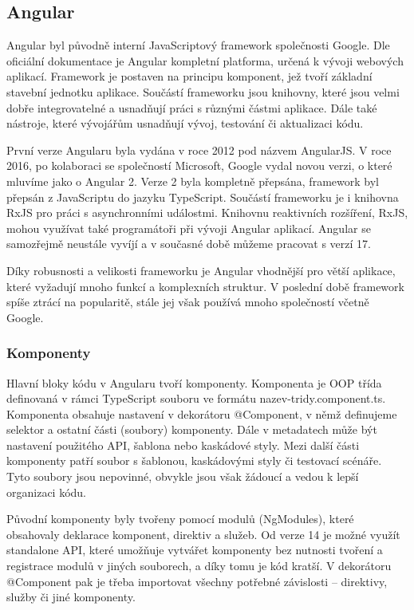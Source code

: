 \subsection{Angular}

Angular byl původně interní JavaScriptový framework společnosti Google. 
Dle oficiální dokumentace \cite{angulario} je Angular kompletní platforma, určená k vývoji webových aplikací. 
Framework je postaven na principu komponent, jež tvoří základní stavební jednotku aplikace. 
Součástí frameworku jsou knihovny, které jsou velmi dobře integrovatelné a usnadňují práci s různými částmi aplikace. 
Dále také nástroje, které vývojářům usnadňují vývoj, testování či aktualizaci kódu.\cite{angulario,learningangular}

První verze Angularu byla vydána v roce 2012 pod názvem AngularJS. 
V roce 2016, po kolaboraci se společností Microsoft, Google vydal novou verzi, o které mluvíme jako o Angular 2. 
Verze 2 byla kompletně přepsána, framework byl přepsán z JavaScriptu do jazyku TypeScript. 
Součástí frameworku je i knihovna RxJS pro práci s asynchronními událostmi. 
Knihovnu reaktivních rozšíření, RxJS, mohou využívat také programátoři při vývoji Angular aplikací. 
Angular se samozřejmě neustále vyvíjí a v současné době můžeme pracovat s verzí 17.\cite{angulardev,learningangular}

Díky robusnosti a velikosti frameworku je Angular vhodnější pro větší aplikace, které vyžadují mnoho funkcí a komplexních struktur. 
V poslední době framework spíše ztrácí na popularitě, stále jej však používá mnoho společností včetně Google.\cite{learningangular}

\subsubsection{Komponenty}

Hlavní bloky kódu v Angularu tvoří komponenty. Komponenta je OOP třída definovaná v rámci TypeScript souboru ve formátu nazev-tridy.component.ts. 
Komponenta obsahuje nastavení v dekorátoru @Component, v němž definujeme selektor a ostatní části (soubory) komponenty. 
Dále v metadatech může být nastavení použitého API, šablona nebo kaskádové styly. 
Mezi další části komponenty patří soubor s šablonou, kaskádovými styly či testovací scénáře. 
Tyto soubory jsou nepovinné, obvykle jsou však žádoucí a vedou k lepší organizaci kódu. 

Původní komponenty byly tvořeny pomocí modulů (NgModules), které obsahovaly deklarace komponent, direktiv a služeb. 
Od verze 14 je možné využít standalone API, které umožňuje vytvářet komponenty bez nutnosti tvoření a registrace modulů v jiných souborech, a díky tomu je kód kratší. 
V dekorátoru @Component pak je třeba importovat všechny potřebné závislosti -- direktivy, služby či jiné komponenty.\cite{angulardev,learningangular}

